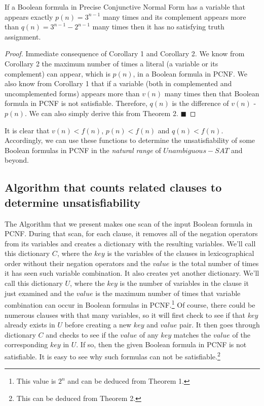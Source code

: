 \documentclass[runningheads,a4paper]{llncs}
\begin{document}
\begin{corollary}\normalfont
If a Boolean formula in Precise Conjunctive Normal Form has a variable that appears exactly $p(n) = 3^{n-1}$ many times and its complement appears more than $q(n) = 3^{n-1}-2^{n-1}$ many times then it has no satisfying truth assignment. 
\begin{proof}\normalfont
Immediate consequence of Corollary 1 and Corollary 2. We know from Corollary 2 the maximum number of times a literal (a variable or its complement) can appear, which is $p(n)$, in a Boolean formula in PCNF. We also know from Corollary 1 that if a variable (both in complemented and uncomplemented forms) appears more than $v(n)$ many times then that Boolean formula in PCNF is not satisfiable. Therefore, $q(n)$ is the difference of $v(n)$ - $p(n)$. We can also simply derive this from Theorem 2. $\blacksquare$
\end{proof}
\end{corollary}

It is clear that $v(n) < f(n)$,  $p(n) < f(n)$ and $q(n) < f(n)$. Accordingly, we can use these functions to determine the unsatisfiability of some Boolean formulas in PCNF in the \emph{natural range} of ${Unambiguous-SAT}$ and beyond. 

\subsection{Algorithm that counts related clauses to determine unsatisfiability}

The Algorithm that we present makes one scan of the input Boolean formula in PCNF. During that scan, for each clause, it removes all of the negation operators from its variables and creates a dictionary with the resulting variables. We'll call this dictionary $C$, where the $key$ is the variables of the clauses in lexicographical order without their negation operators and the $value$ is the total number of times it has seen such variable combination. It also creates yet another dictionary. We'll call this dictionary $U$, where the $key$ is the number of variables in the clause it just examined and the $value$ is the maximum number of times that variable combination can occur in Boolean formulas in PCNF.\footnote{This value is $2^{n}$ and can be deduced from Theorem 1.} Of course, there could be numerous clauses with that many variables, so it will  first check to see if that $key$ already exists in $U$ before creating a new $key$ and $value$ pair. It then goes through dictionary $C$ and checks to see if the $value$ of any $key$ matches the $value$ of the corresponding $key$ in $U$. If so, then the given Boolean formula in PCNF is not satisfiable. It is easy to see why such formulas can not be satisfiable.\footnote{This can be deduced from Theorem 2.}
\end{document}
